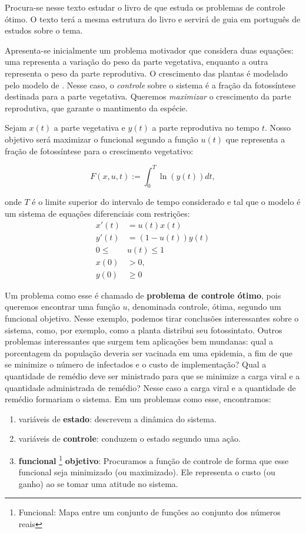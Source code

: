Procura-se nesse texto estudar o livro de \cite{lenhart2007} que estuda os
problemas de controle ótimo. O texto terá a mesma estrutura do livro e servirá
de guia em português de estudos sobre o tema. 

    Apresenta-se inicialmente um problema motivador que considera duas equações: uma
    representa a variação do peso da parte vegetativa, enquanto a outra representa
    o peso da parte reprodutiva. O crescimento das plantas é modelado pelo modelo
    de \cite{cohen1971299}. Nesse caso, o \textit{controle} sobre o sistema é a fração
    da fotossíntese destinada para a parte vegetativa. Queremos \textit{maximizar} o 
    crescimento da parte reprodutiva, que garante o mantimento da espécie. 

    Sejam $x(t)$ a parte vegetativa e $y(t)$ a parte reprodutiva no
    tempo $t$. Nosso objetivo será maximizar o funcional 
    segundo a função $u(t)$ que representa a fração de fotossíntese para
    o crescimento vegetativo: 

    \begin{equation}
        \label{funcional-maximize}
        F(x,u,t) := \int_0^T \ln(y(t))dt, 
    \end{equation}

    onde $T$ é o limite superior do intervalo de tempo considerado e tal que o
    modelo é um sistema de equações diferenciais com restrições: 
    \begin{align*}
        x'(t) &= u(t)x(t) \\
        y'(t) &= (1 - u(t))y(t) \\
        0 \leq &u(t) \leq 1 \\
        x(0) &> 0, \\
        y(0) &\geq 0
    \end{align*}    

Um problema como esse é chamado de \textbf{problema de controle ótimo}, pois
queremos encontrar uma função $u$, denominada controle, ótima, segundo um
funcional objetivo. Nesse exemplo, podemos tirar conclusões interessantes
sobre o sistema, como, por exemplo, como a planta distribui seu fotossintato.
Outros problemas interessantes que surgem tem aplicações bem mundanas: qual a
porcentagem da população deveria ser vacinada em uma epidemia, a fim de que se
minimize o número de infectados e o custo de implementação? Qual a quantidade
de remédio deve ser ministrado para que se minimize a carga viral e a
quantidade administrada de remédio? Nesse caso a carga viral e a quantidade de
remédio formariam o sistema.  
Em um problemas como esse, encontramos: 
\begin{enumerate}
    \item variáveis de \textbf{estado}: descrevem a dinâmica do sistema. 
    \item variáveis de \textbf{controle}: conduzem o estado segundo uma ação. 
    \item \textbf{funcional} \footnote{Funcional: Mapa entre um conjunto de funções ao
    conjunto dos números reais} \textbf{objetivo}: Procuramos a função de
    controle de forma que esse funcional seja minimizado (ou maximizado). Ele
    representa o custo (ou ganho) ao se tomar uma atitude no sistema. 
\end{enumerate}
